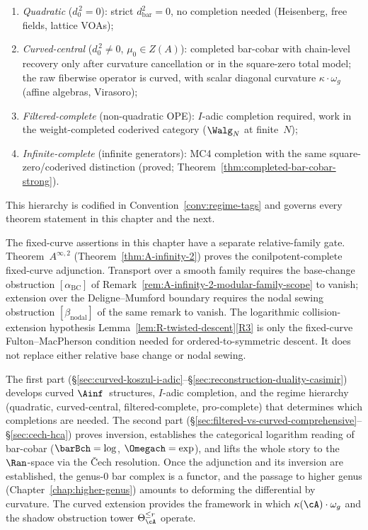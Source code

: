 \begin{enumerate}[label=\textup{(\roman*)}]
\item \emph{Quadratic} ($d_0^{\,2} = 0$): strict $d_{\mathrm{bar}}^2 = 0$,
 no completion needed (Heisenberg, free fields, lattice VOAs);
\item \emph{Curved-central} ($d_0^{\,2} \neq 0$,
 $\mu_0 \in Z(A)$): completed bar-cobar with chain-level recovery
 only after curvature cancellation or in the square-zero total
 model; the raw fiberwise operator is curved, with scalar diagonal
 curvature $\kappa \cdot \omega_g$ (affine algebras, Virasoro);
\item \emph{Filtered-complete} (non-quadratic OPE):
 $I$-adic completion required, work in the weight-completed
 coderived category
 ($\Walg_N$ at finite~$N$);
\item \emph{Infinite-complete} (infinite generators):
 MC4 completion with the same square-zero/coderived distinction
 (proved; Theorem~\ref{thm:completed-bar-cobar-strong}).
\end{enumerate}
This hierarchy is codified in Convention~\ref{conv:regime-tags} and
governs every theorem statement in this chapter and the next.

The fixed-curve assertions in this chapter have a separate
relative-family gate. Theorem~$A^{\infty,2}$
(Theorem~\ref{thm:A-infinity-2}) proves the conilpotent-complete
fixed-curve adjunction. Transport over a smooth family requires the
base-change obstruction
$[\alpha_{\mathrm{BC}}]$ of
Remark~\ref{rem:A-infinity-2-modular-family-scope} to vanish; extension
over the Deligne--Mumford boundary requires the nodal sewing
obstruction $[\beta_{\mathrm{nodal}}]$ of the same remark to vanish.
The logarithmic collision-extension hypothesis
Lemma~\ref{lem:R-twisted-descent}\textup{\ref{R3}} is only the
fixed-curve Fulton--MacPherson condition needed for ordered-to-symmetric
descent. It does not replace either relative base change or nodal
sewing.

The first part
(\S\ref{sec:curved-koszul-i-adic}--\S\ref{sec:reconstruction-duality-casimir})
develops curved $\Ainf$~structures, $I$-adic completion, and the
regime hierarchy (quadratic, curved-central, filtered-complete,
pro-complete) that determines which completions are needed. The
second part
(\S\ref{sec:filtered-vs-curved-comprehensive}--\S\ref{sec:cech-hca})
proves inversion, establishes the categorical logarithm reading of
bar-cobar ($\barBch = \log$, $\Omegach = \exp$), and lifts the
whole story to the $\Ran$-space via the \v{C}ech resolution.
Once the adjunction and its inversion are established, the
genus-$0$ bar complex is a functor, and the passage to higher genus
(Chapter~\ref{chap:higher-genus}) amounts to deforming the
differential by curvature. The curved extension provides the
framework in which $\kappa(\cA) \cdot \omega_g$ and the shadow
obstruction tower $\Theta_\cA^{\leq r}$ operate.

